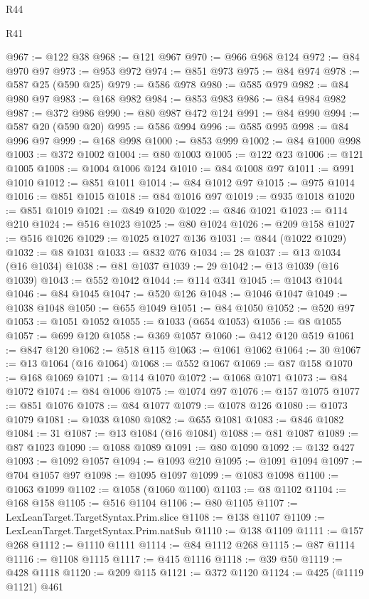 \begin{lexlean}{R44}
\begin{lexlean}{R41}
\begin{coremodule}
{{{{{{{{{{{{{{{{{{{{{{{{{{{{{{{{{{{{{{{{{{{{{{{{{{{{{{{{{{{{{{{{{{{{{{{{{{{{{{{{{{{{{{{@967 := @122 @38
@968 := @121 @967
@970 := @966 @968 @124
@972 := @84 @970 @97
@973 := @953 @972
@974 := @851 @973
@975 := @84 @974
@978 := @587 @25 (@590 @25)
@979 := @586 @978
@980 := @585 @979
@982 := @84 @980 @97
@983 := @168 @982
@984 := @853 @983
@986 := @84 @984 @982
@987 := @372 @986
@990 := @80 @987 @472 @124
@991 := @84 @990
@994 := @587 @20 (@590 @20)
@995 := @586 @994
@996 := @585 @995
@998 := @84 @996 @97
@999 := @168 @998
@1000 := @853 @999
@1002 := @84 @1000 @998
@1003 := @372 @1002
@1004 := @80 @1003
@1005 := @122 @23
@1006 := @121 @1005
@1008 := @1004 @1006 @124
@1010 := @84 @1008 @97
@1011 := @991 @1010
@1012 := @851 @1011
@1014 := @84 @1012 @97
@1015 := @975 @1014
@1016 := @851 @1015
@1018 := @84 @1016 @97
@1019 := @935 @1018
@1020 := @851 @1019
@1021 := @849 @1020
@1022 := @846 @1021
@1023 := @114 @210
@1024 := @516 @1023
@1025 := @80 @1024
@1026 := @209 @158
@1027 := @516 @1026
@1029 := @1025 @1027 @136
@1031 := @844 (@1022 @1029)
@1032 := @8 @1031
@1033 := @832 @76
@1034 := 28
@1037 := @13 @1034 (@16 @1034)
@1038 := @81 @1037
@1039 := 29
@1042 := @13 @1039 (@16 @1039)
@1043 := @552 @1042
@1044 := @114 @341
@1045 := @1043 @1044
@1046 := @84 @1045
@1047 := @520 @126
@1048 := @1046 @1047
@1049 := @1038 @1048
@1050 := @655 @1049
@1051 := @84 @1050
@1052 := @520 @97
@1053 := @1051 @1052
@1055 := @1033 (@654 @1053)
@1056 := @8 @1055
@1057 := @699 @120
@1058 := @369 @1057
@1060 := @412 @120 @519
@1061 := @847 @120
@1062 := @518 @115
@1063 := @1061 @1062
@1064 := 30
@1067 := @13 @1064 (@16 @1064)
@1068 := @552 @1067
@1069 := @87 @158
@1070 := @168 @1069
@1071 := @114 @1070
@1072 := @1068 @1071
@1073 := @84 @1072
@1074 := @84 @1006
@1075 := @1074 @97
@1076 := @157 @1075
@1077 := @851 @1076
@1078 := @84 @1077
@1079 := @1078 @126
@1080 := @1073 @1079
@1081 := @1038 @1080
@1082 := @655 @1081
@1083 := @846 @1082
@1084 := 31
@1087 := @13 @1084 (@16 @1084)
@1088 := @81 @1087
@1089 := @87 @1023
@1090 := @1088 @1089
@1091 := @80 @1090
@1092 := @132 @427
@1093 := @1092 @1057
@1094 := @1093 @210
@1095 := @1091 @1094
@1097 := @704 @1057 @97
@1098 := @1095 @1097
@1099 := @1083 @1098
@1100 := @1063 @1099
@1102 := @1058 (@1060 @1100)
@1103 := @8 @1102
@1104 := @168 @158
@1105 := @516 @1104
@1106 := @80 @1105
@1107 := LexLeanTarget.TargetSyntax.Prim.slice
@1108 := @138 @1107
@1109 := LexLeanTarget.TargetSyntax.Prim.natSub
@1110 := @138 @1109
@1111 := @157 @268
@1112 := @1110 @1111
@1114 := @84 @1112 @268
@1115 := @87 @1114
@1116 := @1108 @1115
@1117 := @415 @1116
@1118 := @39 @50
@1119 := @428 @1118
@1120 := @209 @115
@1121 := @372 @1120
@1124 := @425 (@1119 @1121) @461
}}}}}}}}}}}}}}}}}}}}}}}}}}}}}}}}}}}}}}}}}}}}}}}}}}}}}}}}}}}}}}}}}}}}}}}}}}}}}}}}}}}}}}}
\end{coremodule}
\end{lexlean}
\end{lexlean}
